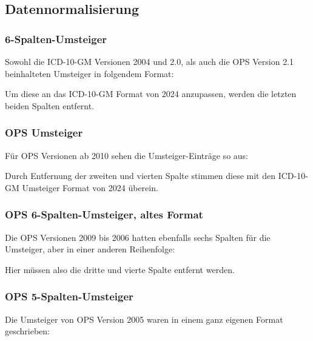 \subsection{Datennormalisierung}

\subsubsection{6-Spalten-Umsteiger}

Sowohl die ICD-10-GM Versionen 2004 und 2.0, als auch die OPS Version 2.1 beinhalteten Umsteiger in folgendem Format:


Um diese an das ICD-10-GM Format von 2024 anzupassen, werden die letzten beiden Spalten entfernt. 

\subsubsection{OPS Umsteiger}

Für OPS Versionen ab 2010 sehen die Umsteiger-Einträge so aus:


Durch Entfernung der zweiten und vierten Spalte stimmen diese mit den ICD-10-GM Umsteiger Format von 2024 überein. 

\subsubsection{OPS 6-Spalten-Umsteiger, altes Format}

Die OPS Versionen 2009 bis 2006 hatten ebenfalls sechs Spalten für die Umsteiger, aber in einer anderen Reihenfolge:


Hier müssen also die dritte und vierte Spalte entfernt werden. 

\subsubsection{OPS 5-Spalten-Umsteiger}

Die Umsteiger von OPS Version 2005 waren in einem ganz eigenen Format geschrieben:


